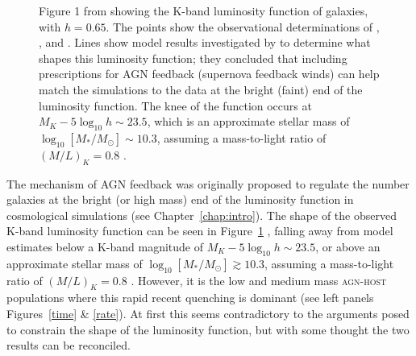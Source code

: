  \begin{figure}
\caption[Galaxy luminosity function from observations and simulations: Figure 1 of \cite{benson03}]{Figure 1 from \cite{benson03} showing the K-band luminosity function of galaxies, with $h=0.65$. The points show the observational determinations of \cite[][circles]{cole01}, \cite[][squares]{kochanek01}, and \cite[][$z < 0.1$, stars]{huang03}. Lines show model results investigated by \cite{benson03} to determine what shapes this luminosity function; they concluded that including prescriptions for AGN feedback (supernova feedback winds) can help match the simulations to the data at the bright (faint) end of the luminosity function. The knee of the function occurs at $M_K -5\log_{10} h \sim 23.5$, which is an approximate stellar mass of $\log_{10}[M_*/M_{\odot}] \sim 10.3$, assuming a mass-to-light ratio of $(M/L)_K = 0.8$ \citep{brinchmann00}.}
\label{lumfunc}
\end{figure}

The mechanism of AGN feedback was originally proposed to regulate the number galaxies at the bright (or high mass) end of the luminosity function in cosmological simulations (see Chapter~\ref{chap:intro}). The shape of the observed K-band luminosity function can be seen in Figure~\ref{lumfunc} \citep[Figure 1 from][]{benson03}, falling away from model estimates below a K-band magnitude of $M_K -5\log_{10} h \sim 23.5$, or above an approximate stellar mass of $\log_{10}[M_*/M_{\odot}] \gtrsim 10.3$, assuming a mass-to-light ratio of $(M/L)_K = 0.8$ \citep{brinchmann00}. However, it is the low and medium mass \textsc{agn-host} populations where this rapid recent quenching is dominant (see left panels Figures~\ref{time} \& \ref{rate}). At first this seems contradictory to the arguments posed to constrain the shape of the luminosity function, but with some thought the two results can be reconciled. 

